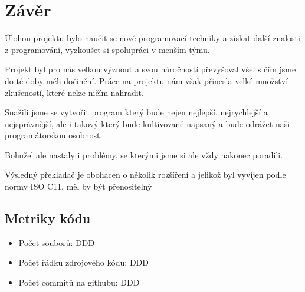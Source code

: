 \section{Závěr}
Úlohou projektu bylo naučit se nové programovací techniky
a získat další znalosti z programování,
vyzkoušet si spolupráci v menším týmu.

Projekt byl pro nás velkou význout a svou náročností převyšoval vše, s čím jsme do té doby měli dočinění.
Práce na projektu nám však přinesla velké množství zkušeností, které nelze ničím nahradit.

Snažili jsme se vytvořit program který bude nejen nejlepší,
nejrychlejší a nejsprávnější, ale i takový který bude kultivovaně
napsaný a bude odrážet naši programátorskou osobnost.

Bohužel ale nastaly i problémy, se kterými jsme si ale vždy
nakonec poradili.

Výsledný překladač je obohacen o několik rozšíření a jelikož
byl vyvíjen podle normy ISO C11, měl by být přenositelný

\subsection{Metriky kódu}
\begin{itemize}
    \item Počet souborů: DDD
    \item Počet řádků zdrojového kódu: DDD
    \item Počet commitů na githubu: DDD
\end{itemize}